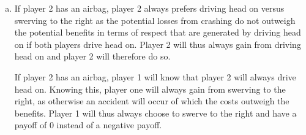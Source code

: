 \documentclass[a4paper]{article}
\begin{document}
\begin{enumerate}[(a)]
\begin{itemize}
Similarly for player 2:
$$u_2(\sigma_1, C)=u_2(\sigma_1,D) \iff \sigma_{1C}=\dfrac{2k_H-R}{2k_H+R}$$

Thus there is one mixed strategy nash equilibruim:

$$(\sigma_{1C},\sigma_{1D}),(\sigma_{2C},\sigma_{2D})=\left(\dfrac{2k_H-R}{2k_H+R},\dfrac{2R}{2k_H+R}\right),\left(\dfrac{2k_H-R}{2k_H+R},\dfrac{2R}{2k_H+R}\right)$$

\item If $k_2=k_L$,\\

We can see that for player 2, the strategy $C$ is strictly dominated by $D$. The following payoff matrix remains after deleting strategy $C$ for player 2. 

{\renewcommand{\arraystretch}{2}
\begin{tabular}{cc|c|}
      & \multicolumn{1}{c}{} & \multicolumn{1}{c}{Player $2$}\\
      & \multicolumn{1}{c}{} & \multicolumn{1}{c}{$D$}   \\\cline{3-3}
      \multirow{2}*{Player $1$}  & $C$ & $\underline{0},R$ \\\cline{3-3}
      & $D$  & $\dfrac{R}{2}-k_H,\dfrac{R}{2}-k_L$ \\\cline{3-3}
\end{tabular}
}

We can now see that for player 1 in this matrix, strategy $D$ is strictly dominated by strategy $C$.\\

This means that there is only one unique pure strategy Nash equilibrium:
$$(C,D)$$ 

And there are no mixed strategy Nash equilibria.
\end{itemize}
\item
If player 2 has an airbag, player 2 always prefers driving head on versus swerving to the right as the potential losses from crashing do not outweigh the potential benefits in terms of respect that are generated by driving head on if both players drive head on.  Player 2 will thus always gain from driving head on and player 2 will therefore do so.

If player 2 has an airbag, player 1 will know that player 2 will always drive head on. Knowing this, player one will always gain from swerving to the right, as otherwise an accident will occur of which the costs outweigh the benefits. Player 1 will thus always choose to swerve to the right and have a payoff of 0 instead of a negative payoff.


\end{enumerate}
\end{document}

